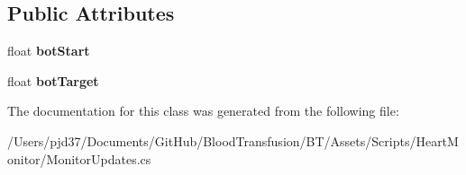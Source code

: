 \subsection*{Public Attributes}
\begin{DoxyCompactItemize}
\item 
float {\bfseries bot\+Start}\hypertarget{class_monitor_updates_1_1_b_p_tween_a21f346b5d00e4421c0f5f0f54dd64e51}{}\label{class_monitor_updates_1_1_b_p_tween_a21f346b5d00e4421c0f5f0f54dd64e51}

\item 
float {\bfseries bot\+Target}\hypertarget{class_monitor_updates_1_1_b_p_tween_a5637121fb9ae7a8b18c990bedf1cbf13}{}\label{class_monitor_updates_1_1_b_p_tween_a5637121fb9ae7a8b18c990bedf1cbf13}

\end{DoxyCompactItemize}


The documentation for this class was generated from the following file\+:\begin{DoxyCompactItemize}
\item 
/\+Users/pjd37/\+Documents/\+Git\+Hub/\+Blood\+Transfusion/\+B\+T/\+Assets/\+Scripts/\+Heart\+Monitor/Monitor\+Updates.\+cs\end{DoxyCompactItemize}
